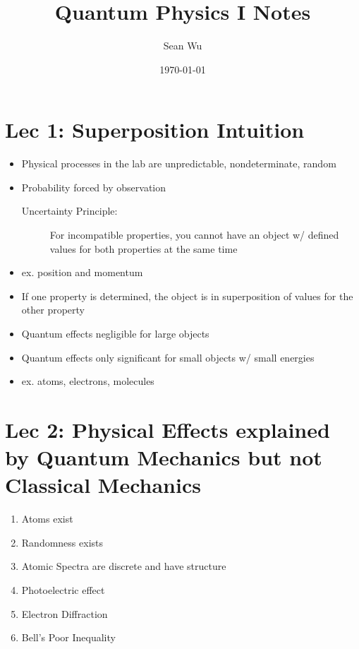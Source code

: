 \documentclass[a4paper,12pt]{article}
\begin{document}
\title{Quantum Physics I Notes}
\author{Sean Wu}
\date{\today}
\maketitle

\tableofcontents

\pagebreak

\setlength{\parindent}{0em}
\setlength{\parskip}{1em}

\section{Lec 1: Superposition Intuition}
\begin{itemize}
  \item Physical processes in the lab are unpredictable, nondeterminate, random
  \item Probability forced by observation

\begin{description}
  \item[Uncertainty Principle:] For incompatible properties, you cannot have an object w/ defined values for both properties at the same time
\end{description}

  \item ex. position and momentum
  \item If one property is determined, the object is in superposition of values for the other property

  \item Quantum effects negligible for large objects
  \item Quantum effects only significant for small objects w/ small energies
  \item ex. atoms, electrons, molecules
\end{itemize}

\section{Lec 2: Physical Effects explained by Quantum Mechanics but not Classical Mechanics}

\begin{enumerate}
  \item Atoms exist
  \item Randomness exists
  \item Atomic Spectra are discrete and have structure
  \item Photoelectric effect
  \item Electron Diffraction
  \item Bell's Poor Inequality
\end{enumerate}
\end{document}
